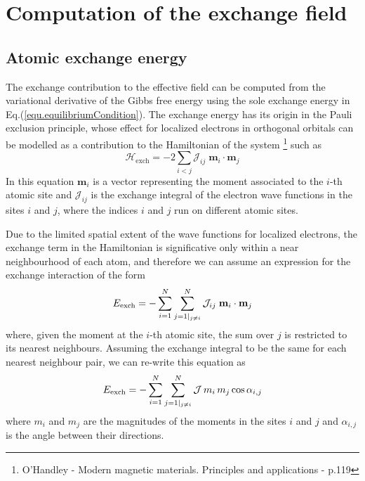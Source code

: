 \documentclass[11pt]{article}
\newcommand{\rv}[1]{\ensuremath{\mathbf{#1}}} %
\begin{document}
\section{Computation of the exchange field }
\subsection{Atomic exchange energy}
The exchange contribution to the effective field can be computed
from the variational derivative of the Gibbs free energy using the
sole exchange energy in Eq.(\ref{equ.equilibriumCondition}). 
The exchange energy has its origin in the Pauli exclusion principle,
whose effect for localized electrons in orthogonal orbitals can be
modelled as a contribution to the Hamiltonian of the system
\footnote{O'Handley - Modern magnetic materials. Principles and
applications - p.119} such as
\begin{equation}
\mathcal{H}_\mathrm{exch} = -2 \sum_{i<j} \mathcal{J}_{ij} \;
\rv{m}_i \cdot \rv{m}_j
\label{equ.heisenbergHamiltonian}
\end{equation}
In this equation $\rv{m}_i$ is a vector representing the
moment associated to the $i$-th atomic site and $\mathcal{J}_{ij}$ is the
exchange integral of the electron wave functions in the sites $i$ and
$j$, where the indices $i$ and $j$ run on different atomic sites.  

Due to the limited spatial extent of the wave functions for localized
electrons, the exchange term in the Hamiltonian is significative only
within a near neighbourhood of each atom, and therefore we can
assume an expression for the exchange interaction of the form
\begin{equation}
E_\mathrm{exch} = - \sum_{i = 1}^{ N} \sum_{j =
                         1\arrowvert_{ j \neq i }}^{ N
                       } \mathcal{J}_{ij} \; \rv{m}_i \cdot \rv{m}_j 
\label{equ.exchEnergy_a}
\end{equation}
where, given the moment at the $i$-th atomic site, the sum over
$j$ is restricted to its nearest neighbours. 
Assuming the exchange integral to be the same for each nearest
neighbour pair, we can re-write this equation as
\begin{equation}
E_\mathrm{exch} = - \sum_{i = 1}^{ N} \sum_{j =
                         1\arrowvert_{ j \neq i }}^{ N
                       } \mathcal{J} \, m_i \,m_j \cos \alpha_{i,j} 
\label{equ.exchEnergy_b}
\end{equation}
where $m_i$ and $m_j$ are the magnitudes of the moments in the sites
$i$ and $j$ and $\alpha_{i,j}$ is the angle between their directions. 
\end{document}

